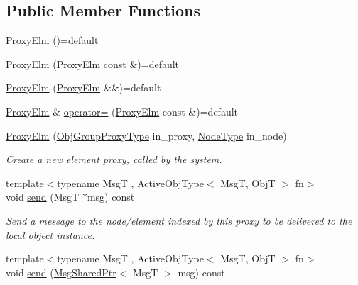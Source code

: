 \subsection*{Public Member Functions}
\begin{DoxyCompactItemize}
\item 
\hyperlink{structvt_1_1objgroup_1_1proxy_1_1_proxy_elm_ad610547c98659b9d34a6dca416a4d319}{Proxy\+Elm} ()=default
\item 
\hyperlink{structvt_1_1objgroup_1_1proxy_1_1_proxy_elm_a50590ebf12e4ae89fc140583412d05b0}{Proxy\+Elm} (\hyperlink{structvt_1_1objgroup_1_1proxy_1_1_proxy_elm}{Proxy\+Elm} const \&)=default
\item 
\hyperlink{structvt_1_1objgroup_1_1proxy_1_1_proxy_elm_aa3feddfc8142ae38f9436ce3ff86efb7}{Proxy\+Elm} (\hyperlink{structvt_1_1objgroup_1_1proxy_1_1_proxy_elm}{Proxy\+Elm} \&\&)=default
\item 
\hyperlink{structvt_1_1objgroup_1_1proxy_1_1_proxy_elm}{Proxy\+Elm} \& \hyperlink{structvt_1_1objgroup_1_1proxy_1_1_proxy_elm_a9211613f646a4f3d215cf1d9e76219db}{operator=} (\hyperlink{structvt_1_1objgroup_1_1proxy_1_1_proxy_elm}{Proxy\+Elm} const \&)=default
\item 
\hyperlink{structvt_1_1objgroup_1_1proxy_1_1_proxy_elm_a59a010b3f1428a77cb12a9806028f399}{Proxy\+Elm} (\hyperlink{namespacevt_ad7cae989df485fccca57f0792a880a8e}{Obj\+Group\+Proxy\+Type} in\+\_\+proxy, \hyperlink{namespacevt_a866da9d0efc19c0a1ce79e9e492f47e2}{Node\+Type} in\+\_\+node)
\begin{DoxyCompactList}\small\item\em Create a new element proxy, called by the system. \end{DoxyCompactList}\item 
{\footnotesize template$<$typename MsgT , Active\+Obj\+Type$<$ Msg\+T, Obj\+T $>$ fn$>$ }\\void \hyperlink{structvt_1_1objgroup_1_1proxy_1_1_proxy_elm_a64d85f6d2721f2001e1e9ecb910e34f9}{send} (MsgT $\ast$msg) const
\begin{DoxyCompactList}\small\item\em Send a message to the node/element indexed by this proxy to be delivered to the local object instance. \end{DoxyCompactList}\item 
{\footnotesize template$<$typename MsgT , Active\+Obj\+Type$<$ Msg\+T, Obj\+T $>$ fn$>$ }\\void \hyperlink{structvt_1_1objgroup_1_1proxy_1_1_proxy_elm_ab3d1751dac7c003cd13306277c164247}{send} (\hyperlink{namespacevt_ab2b3d506ec8e8d1540aede826d84a239}{Msg\+Shared\+Ptr}$<$ MsgT $>$ msg) const

\end{DoxyCompactItemize}
